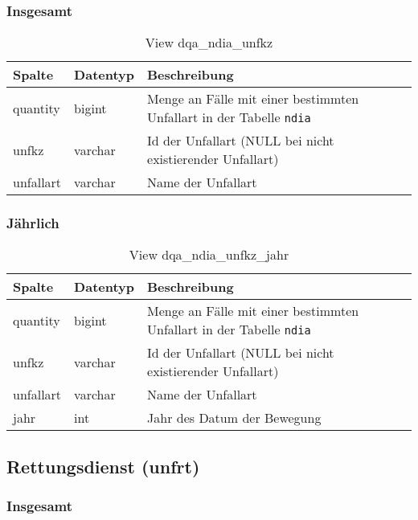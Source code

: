 \subsubsection{Insgesamt} \label{subsubsec:bewUnfkzI}

\begin{table}[ht]
	\centering   
	\caption{View dqa\_ndia\_unfkz}
	\label{tab:bewUnfkzI}
	\begin{tabular}{||l|l|p{10cm}||}   		
		\hline
		Spalte & Datentyp & Beschreibung \\ [0.5ex]
		\hline\hline
		quantity & bigint & Menge an Fälle mit einer bestimmten Unfallart in der Tabelle \texttt{ndia} \\
		\hline
		unfkz & varchar & Id der Unfallart (NULL bei nicht existierender Unfallart)\\
		\hline
		unfallart & varchar & Name der Unfallart \\
		\hline
		
	\end{tabular}
\end{table}

\subsubsection{Jährlich} \label{subsubsec:bewUnfkzJ}

\begin{table}[ht]
	\centering   
	\caption{View dqa\_ndia\_unfkz\_jahr}
	\label{tab:bewUnfkzJ}
	\begin{tabular}{||l|l|p{10cm}||}
		\hline
		Spalte & Datentyp & Beschreibung \\ [0.5ex]
		\hline\hline
		quantity & bigint & Menge an Fälle mit einer bestimmten Unfallart in der Tabelle \texttt{ndia}\\
		\hline
		unfkz & varchar & Id der Unfallart (NULL bei nicht existierender Unfallart)\\
		\hline
		unfallart & varchar & Name der Unfallart \\
		\hline
		jahr & int &  Jahr des Datum der Bewegung \\
		\hline		
	\end{tabular}
\end{table}

\subsection{Rettungsdienst (unfrt)} \label{subsec:bewUnfrt}

\subsubsection{Insgesamt} \label{subsubsec:bewUnfrtI}

